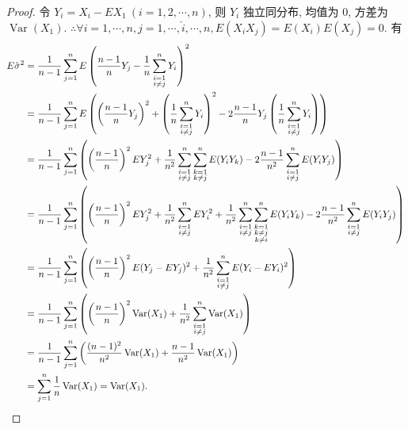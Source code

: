 \documentclass{ctexart}
\begin{document}
\begin{proof}
    令 $Y_i=X_i-EX_1\ (i=1,2,\cdots,n)$, 则 $Y_i$ 独立同分布, 均值为 $0$, 方差为 $\operatorname{Var}(X_1)$. $\therefore\forall i=1,\cdots,n,j=1,\cdots,\hat{i},\cdots,n,E(X_iX_j)=E(X_i)E(X_j)=0$. 有
    \begin{align*}
        E\hat{\sigma}^2 & =\dfrac{1}{n-1}\sum\limits_{j=1}^nE\left(\dfrac{n-1}{n}Y_j-\dfrac{1}{n}\sum\limits_{\substack{i=1\\i\neq j}}^nY_i\right)^2 \\
        & =\dfrac{1}{n-1}\sum\limits_{j=1}^nE\left(\left(\dfrac{n-1}{n}Y_j\right)^2+\left(\dfrac{1}{n}\sum\limits_{\substack{i=1\\i\neq j}}^nY_i\right)^2-2\dfrac{n-1}{n}Y_j\left(\dfrac{1}{n}\sum\limits_{\substack{i=1\\i\neq j}}^nY_i\right)\right) \\
        & =\dfrac{1}{n-1}\sum\limits_{j=1}^n\left(\left(\dfrac{n-1}{n}\right)^2EY_j^2+\dfrac{1}{n^2}\sum\limits_{\substack{i=1\\i\neq j}}^n\sum\limits_{\substack{k=1\\k\neq j}}^nE(Y_iY_k)-2\dfrac{n-1}{n^2}\sum\limits_{\substack{i=1\\i\neq j}}^nE(Y_iY_j)\right) \\
        & =\dfrac{1}{n-1}\sum\limits_{j=1}^n\left(\left(\dfrac{n-1}{n}\right)^2EY_j^2+\dfrac{1}{n^2}\sum\limits_{\substack{i=1\\i\neq j}}^nEY_i^2+\dfrac{1}{n^2}\sum\limits_{\substack{i=1\\i\neq j}}^n\sum\limits_{\substack{k=1\\k\neq j\\k\neq i}}^nE(Y_iY_k)-2\dfrac{n-1}{n^2}\sum\limits_{\substack{i=1\\i\neq j}}^nE(Y_iY_j)\right) \\
        & =\dfrac{1}{n-1}\sum\limits_{j=1}^n\left(\left(\dfrac{n-1}{n}\right)^2E(Y_j-EY_j)^2+\dfrac{1}{n^2}\sum\limits_{\substack{i=1\\i\neq j}}^nE(Y_i-EY_i)^2\right) \\
        & =\dfrac{1}{n-1}\sum\limits_{j=1}^n\left(\left(\dfrac{n-1}{n}\right)^2\operatorname{Var}(X_1)+\dfrac{1}{n^2}\sum\limits_{\substack{i=1\\i\neq j}}^n\operatorname{Var}(X_1)\right) \\
        & =\dfrac{1}{n-1}\sum\limits_{j=1}^n\left(\dfrac{(n-1)^2}{n^2}\operatorname{Var}(X_1)+\dfrac{n-1}{n^2}\operatorname{Var}(X_1)\right) \\
        & =\sum\limits_{j=1}^n\dfrac{1}{n}\operatorname{Var}(X_1)=\operatorname{Var}(X_1).\qedhere
    \end{align*}
\end{proof}
\end{document}
